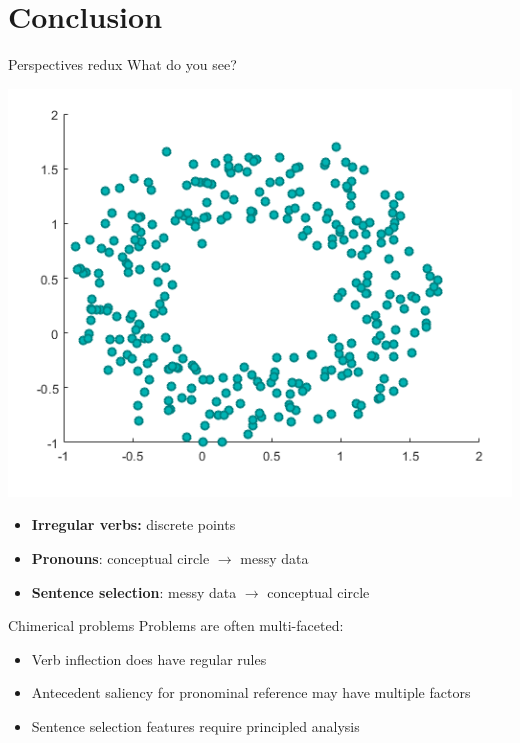 \documentclass[10pt, compress]{beamer}		%
\begin{document}
\section{Conclusion}
\begin{frame}{Perspectives redux}
	What do you see?
	\begin{center}
		\includegraphics[width=.6\textwidth]{images/circleplot.png}
	\end{center}

	\pause
	\begin{itemize}
		\item \textbf{Irregular verbs:} discrete points	\pause
		\item \textbf{Pronouns}: conceptual circle $\rightarrow$ messy data	\pause
		\item \textbf{Sentence selection}: messy data $\rightarrow$ conceptual circle
	\end{itemize}
\end{frame}

\begin{frame}{Chimerical problems}
	Problems are often multi-faceted:

	\begin{itemize}
		\item Verb inflection does have regular rules
		\item Antecedent saliency for pronominal reference may have multiple factors
		\item Sentence selection features require principled analysis
	\end{itemize}
\end{frame}
\end{document}
